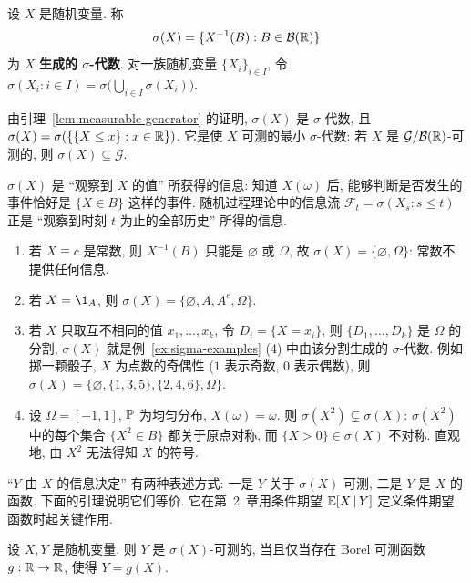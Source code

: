 \begin{definition}\label{def:sigma-X}
设 $X$ 是随机变量. 称
\[
\sigma(X)=\{X^{-1}(B): B\in\mathcal{B}(\R)\}
\]
为 $X$ \textbf{生成的 $\sigma$-代数}. 对一族随机变量 $\{X_i\}_{i\in I}$, 令 $\sigma(X_i: i\in I)=\sigma\big(\bigcup_{i\in I}\sigma(X_i)\big)$.
\end{definition}

由引理~\ref{lem:measurable-generator} 的证明, $\sigma(X)$ 是 $\sigma$-代数, 且 $\sigma(X)=\sigma(\{\{X\le x\}: x\in\R\})$. 它是使 $X$ 可测的最小 $\sigma$-代数: 若 $X$ 是 $\mathcal{G}/\mathcal{B}(\R)$-可测的, 则 $\sigma(X)\subseteq\mathcal{G}$.

\begin{intuition}
$\sigma(X)$ 是 ``观察到 $X$ 的值'' 所获得的信息: 知道 $X(\omega)$ 后, 能够判断是否发生的事件恰好是 $\{X\in B\}$ 这样的事件. 随机过程理论中的信息流 $\mathcal{F}_t=\sigma(X_s: s\le t)$ 正是 ``观察到时刻 $t$ 为止的全部历史'' 所得的信息.
\end{intuition}

\begin{example}\label{ex:sigma-X}
\begin{enumerate}
\item 若 $X\equiv c$ 是常数, 则 $X^{-1}(B)$ 只能是 $\varnothing$ 或 $\Omega$, 故 $\sigma(X)=\{\varnothing,\Omega\}$: 常数不提供任何信息.
\item 若 $X=\1_A$, 则 $\sigma(X)=\{\varnothing,A,A^c,\Omega\}$.
\item 若 $X$ 只取互不相同的值 $x_1,\dots,x_k$, 令 $D_i=\{X=x_i\}$, 则 $\{D_1,\dots,D_k\}$ 是 $\Omega$ 的分割, $\sigma(X)$ 就是例~\ref{ex:sigma-examples} (4) 中由该分割生成的 $\sigma$-代数. 例如掷一颗骰子, $X$ 为点数的奇偶性 ($1$ 表示奇数, $0$ 表示偶数), 则 $\sigma(X)=\{\varnothing,\{1,3,5\},\{2,4,6\},\Omega\}$.
\item 设 $\Omega=[-1,1]$, $\P$ 为均匀分布, $X(\omega)=\omega$. 则 $\sigma(X^2)\subsetneq\sigma(X)$: $\sigma(X^2)$ 中的每个集合 $\{X^2\in B\}$ 都关于原点对称, 而 $\{X>0\}\in\sigma(X)$ 不对称. 直观地, 由 $X^2$ 无法得知 $X$ 的符号.
\end{enumerate}
\end{example}

``$Y$ 由 $X$ 的信息决定'' 有两种表述方式: 一是 $Y$ 关于 $\sigma(X)$ 可测, 二是 $Y$ 是 $X$ 的函数. 下面的引理说明它们等价. 它在第~2~章用条件期望 $\E[X\,|\,Y]$ 定义条件期望函数时起关键作用.

\begin{lemma}\label{lem:doob-dynkin}
设 $X,Y$ 是随机变量. 则 $Y$ 是 $\sigma(X)$-可测的, 当且仅当存在 Borel 可测函数 $g:\R\to\R$, 使得 $Y=g(X)$.
\end{lemma}

